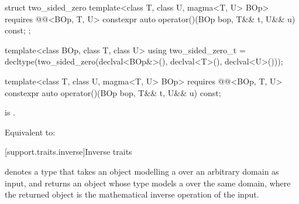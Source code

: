 \begin{itemdecl}
  struct two_sided_zero {
     template<class T, class U, magma<T, U> BOp>
     requires @@<BOp, T, U>
     constexpr auto operator()(BOp bop, T&& t, U&& u) const;
  };

  template<class BOp, class T, class U>
  using two_sided_zero_t =
    decltype(two_sided_zero{}(declval<BOp&>(), declval<T>(), declval<U>()));
\end{itemdecl}

\begin{itemdecl}
template<class T, class U, magma<T, U> BOp>
requires @@<BOp, T, U>
constexpr auto operator()(BOp bop, T&& t, U&& u) const;
\end{itemdecl}
\begin{itemdescr}
   \pnum
   \expects {} is .

   \pnum
   \effects Equivalent to:
   \begin{codeblock}
      return left_zero<BOp>(std::forward<T>(t), std::forward<U>(u));}
   \end{codeblock}
\end{itemdescr}

[support.traits.inverse]{Inverse traits}

\pnum
{} denotes a type that takes an object modelling a  over an
arbitrary domain as input, and returns an object whose type models a  over the same
domain, where the returned object is the mathematical inverse operation of the input.

